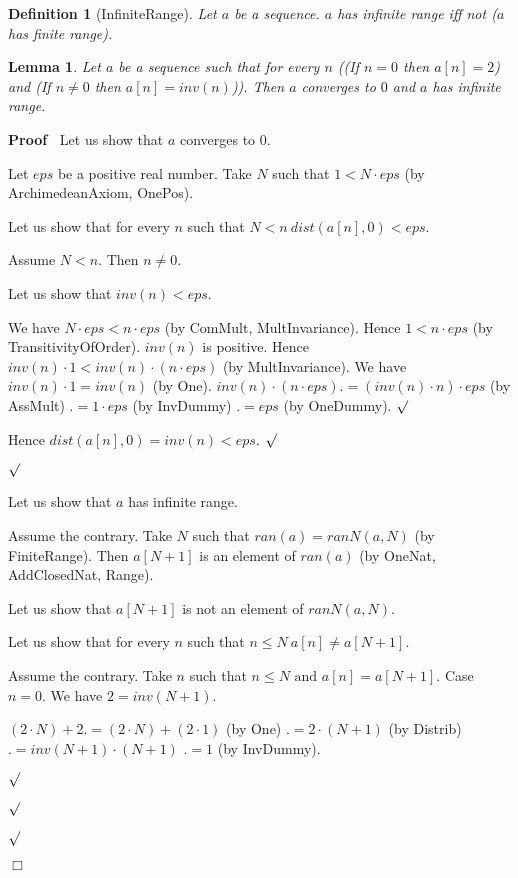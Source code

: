 \documentclass{article}
\newenvironment{forthel}{\begin{leftbar}}{\end{leftbar}}
\newenvironment{proof}{\noindent\textbf{Proof\ }}{\hspace*{\fill}$\Box$\medskip}
\newenvironment{subproof}{\begin{list}{}{}
		\item[\text{Proof}]}{\hfill $\surd$ \end{list}}
\newtheorem{lemma}{Lemma}
\newtheorem{definition}{Definition}
\begin{document}
\begin{forthel}
	\begin{definition} [InfiniteRange] Let $a$ be a sequence. $a$ has infinite range iff not ($a$ has finite range).
	\end{definition}
	
	\begin{lemma} Let $a$ be a sequence such that for every $n$
	((If $n = 0$ then $a[n] = 2$) and (If $n \neq 0$ then $a[n] = inv(n)$)).
	Then $a$ converges to $0$ and $a$ has infinite range.
	\end{lemma}
	\begin{proof} Let us show that $a$ converges to $0$.
	\begin{subproof}
	Let $eps$ be a positive real number. 
	Take $N$ such that $1 < N \cdot eps$ (by ArchimedeanAxiom, OnePos).
	
	Let us show that for every $n$ such that $N < n \ dist(a[n],0) < eps$.
	\begin{subproof}
	Assume $N < n$. Then $n \neq 0$.

	Let us show that $inv(n) < eps$.
	\begin{subproof}
	We have $N \cdot eps < n \cdot eps$ (by ComMult, MultInvariance).
	Hence $1 < n \cdot eps$ (by TransitivityOfOrder).
	$inv(n)$ is positive.
	Hence $inv(n) \cdot 1 < inv(n) \cdot (n \cdot eps)$ (by MultInvariance).
	We have $inv(n) \cdot 1 = inv(n)$ (by One).
	$inv(n) \cdot (n \cdot eps) .= (inv(n) \cdot n) \cdot eps$ (by AssMult)
	$.= 1 \cdot eps$ (by InvDummy)
	$.= eps$ (by OneDummy).
	\end{subproof}
	Hence $dist(a[n],0) = inv(n) < eps$.
	\end{subproof}
	\end{subproof}
	
	Let us show that $a$ has infinite range.
	\begin{subproof}
	Assume the contrary.
	Take $N$ such that $ran(a) = ranN(a,N)$ (by FiniteRange).
	Then $a[N + 1]$ is an element of $ran(a)$ (by OneNat, AddClosedNat, Range).
	
	Let us show that $a[N + 1]$ is not an element of $ranN(a,N)$.
	\begin{subproof}
	Let us show that for every $n$ such that $n \leq N \ a[n] \neq a[N + 1]$.
	\begin{subproof}
	Assume the contrary.
	Take $n$ such that $n \leq N \text{ and } a[n] = a[N + 1]$.
	Case $n = 0$.
	We have $2 = inv(N + 1)$.
	
	$(2 \cdot N) + 2 .= (2 \cdot N) + (2 \cdot 1)$ (by One)
	$.= 2 \cdot (N + 1)$ (by Distrib)
	$.= inv(N + 1) \cdot (N + 1)$
	$.= 1$ (by InvDummy).
	

\end{subproof}
\end{subproof}
\end{subproof}
\end{proof}
\end{forthel}
\end{document}
